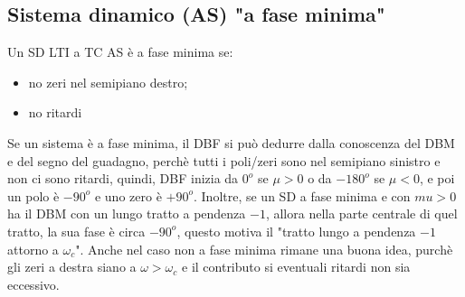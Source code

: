\begin{landscape}
\begin{multicols*}{2}
    \subsection{Sistema dinamico (AS) "a fase minima"}
    Un SD LTI a TC AS è a fase minima se:
    \begin{itemize}
        \item no zeri nel semipiano destro;
        \item no ritardi
    \end{itemize}
    Se un sistema è a fase minima, il DBF si può dedurre dalla conoscenza del DBM e del segno del guadagno, perchè tutti i poli/zeri sono nel semipiano sinistro e non ci sono ritardi, quindi, DBF inizia da $0^o$ se $\mu> 0$ o da $-180^o$ se $\mu< 0$, e poi un polo è $-90^o$ e uno zero è $+ 90^o$.\newline
    Inoltre, se un SD a fase minima e con $mu > 0$ ha il DBM con un lungo tratto a pendenza $-1$, allora nella parte centrale di quel tratto, la sua fase è circa $-90^o$, questo motiva il "tratto lungo a pendenza $-1$ attorno a $\omega_c$".\newline
    Anche nel caso non a fase minima rimane una buona idea, purchè gli zeri a destra siano a $\omega > \omega_c$ e il contributo si eventuali ritardi non sia eccessivo.

\end{multicols*}
\end{landscape}
